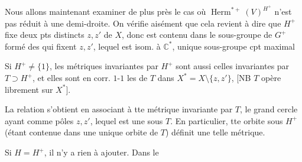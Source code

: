 Nous allons maintenant examiner de plus près le cas où  $\operatorname{Herm}^{*+}(V)^{H^+}$ n'est pas réduit à une demi-droite. On vérifie aisément que cela revient à dire que $H^+$  fixe deux pts distincts $z,z'$ de $X$, donc est contenu dans le sous-groupe de $G^+$  formé des  qui fixent $z,z'$, lequel est isom. à $\mathbb C^*$,  unique sous-groupe cpt maximal 

Si $H^+\ne\{1\}$, les métriques invariantes par $H^+$ sont aussi celles invariantes par $T\supset H^+$,
et elles sont en corr. $1$-$1$  les  de $T$ dans $X^*=X\setminus\{z,z'\}$, [NB $T$ opère librement sur $X^*$].

La relation s'obtient en associant à tte métrique invariante par $T$, le  grand cercle ayant comme pôles $z,z'$, lequel est une  sous $T$. En particulier, tte orbite sous $H^+$ (étant contenue dans une unique orbite de $T$) définit une telle métrique.

Si $H=H^+$, il n'y a  rien à ajouter. Dans le
